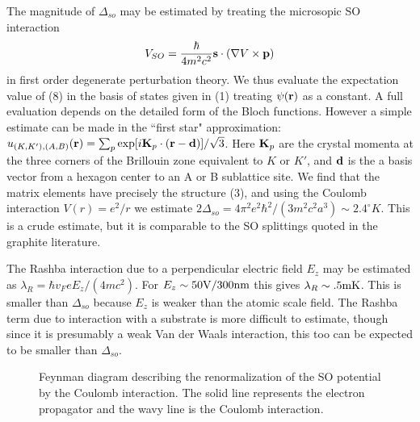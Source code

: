 \documentclass[twocolumn,showpacs,floatfix,prl]{revtex4}
\begin{document}
The magnitude of $\Delta_{so}$ may be estimated
by treating the microsopic SO interaction
\begin{equation}
V_{SO}={\hbar\over{4 m^2 c^2}}{\bf s} \cdot({\bf \nabla}V \times {\bf p})
\end{equation}
 in first order degenerate
perturbation theory.  We thus evaluate the expectation value of
(8) in the basis of states given in (1) treating  $\psi({\bf r})$ as a constant.
A full evaluation depends on the detailed form of the Bloch functions.
However a simple estimate can be made in the ``first
star" approximation: $u_{(K,K'),(A,B)}({\bf
r}) = \sum_p \exp [ i {\bf K}_p\cdot({\bf r} - {\bf d})]
/\sqrt{3}$. Here ${\bf K}_p$ are the crystal momenta at the three
corners of the Brillouin zone equivalent to $K$ or $K'$, and
${\bf d}$ is the a
basis vector from a hexagon center to an A or B sublattice site.
We find that the matrix elements have precisely the structure (3), and
using the Coulomb interaction $V(r) = e^2/r$ we estimate $2\Delta_{so} =
4\pi^2 e^2 \hbar^2 /(3 m^2 c^2 a^3) \sim 2.4^\circ K$. This is a
crude estimate, but it is comparable to the SO splittings
quoted in the graphite literature\cite{review}.

The Rashba interaction due to a perpendicular electric field $E_z$ may be
estimated as $\lambda_R = \hbar v_F
e E_z/(4mc^2)$.  For $E_z \sim 50{\rm V}/300{\rm nm}$\cite{kato} this gives $\lambda_R
\sim .5 {\rm mK}$.  This is smaller than $\Delta_{so}$ because
$E_z$ is weaker than the atomic scale field.
The Rashba term due to interaction with a substrate is
more difficult to estimate, though since it is
presumably a weak Van der Waals interaction, this too can be expected
to be smaller than $\Delta_{so}$.

\begin{figure}
 \centerline{  }
 \caption{Feynman diagram describing the renormalization of the SO potential by the
 Coulomb interaction.  The solid line represents the electron propagator and the wavy line
 is the Coulomb interaction.}
 \end{figure}
\end{document}
